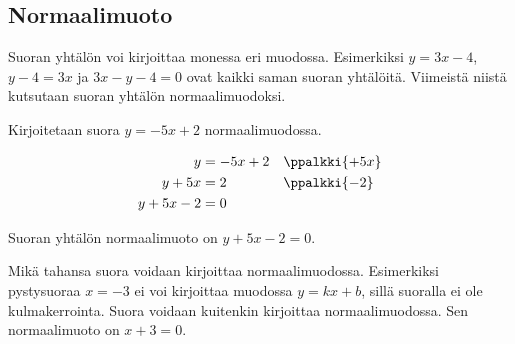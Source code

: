 \subsection*{Normaalimuoto}

Suoran yhtälön voi kirjoittaa monessa eri muodossa. Esimerkiksi $y=3x-4$, $y-4=3x$ ja $3x-y-4=0$ ovat kaikki saman suoran yhtälöitä. Viimeistä niistä kutsutaan 
suoran yhtälön normaalimuodoksi.


\begin{esimerkki}
Kirjoitetaan suora $y=-5x+2$ normaalimuodossa.
\begin{esimratk}
\begin{align*}
y&=-5x+2 && \ppalkki{+5x} \\
y+5x&=2 && \ppalkki{-2} \\
y+5x-2&=0 &&
\end{align*}
\end{esimratk}
\begin{esimvast}
Suoran yhtälön normaalimuoto on $y+5x-2=0$.
\end{esimvast}
\end{esimerkki}


Mikä tahansa suora voidaan kirjoittaa normaalimuodossa. Esimerkiksi pystysuoraa $x=-3$ ei voi kirjoittaa muodossa $y=kx+b$, sillä suoralla ei ole kulmakerrointa. Suora voidaan kuitenkin kirjoittaa normaalimuodossa. Sen normaalimuoto on $x+3=0$.

